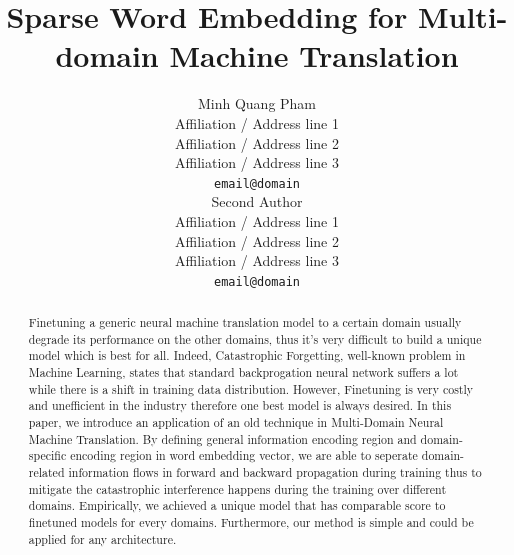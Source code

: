 \documentclass[11pt,a4paper]{article}
\title{Sparse Word Embedding for Multi-domain Machine Translation}
\author{Minh Quang Pham\\
  Affiliation / Address line 1 \\
  Affiliation / Address line 2 \\
  Affiliation / Address line 3 \\
  {\tt email@domain} \\\And
  Second Author \\
  Affiliation / Address line 1 \\
  Affiliation / Address line 2 \\
  Affiliation / Address line 3 \\
  {\tt email@domain} \\}
\date{}
\begin{document}
\maketitle
\begin{abstract}
Finetuning a generic neural machine translation model to a certain domain usually degrade its performance on the other domains, thus it's very difficult to build a unique model which is best for all. Indeed, Catastrophic Forgetting, well-known problem in Machine Learning, states that standard backprogation neural network suffers a lot while there is a shift in training data distribution. However, Finetuning is very costly and unefficient in the industry therefore one best model is always desired. In this paper, we introduce an application of an old technique \cite{P07-1033} in Multi-Domain Neural Machine Translation. By defining general information encoding region and domain-specific encoding region in word embedding vector, we are able to seperate domain-related information flows in forward and backward propagation during training thus to
mitigate the catastrophic interference happens during the training over different domains. Empirically, we achieved a unique model that has comparable score to finetuned models for every domains. Furthermore, our method is simple and could be applied for any architecture.
\end{abstract}
\end{document}

